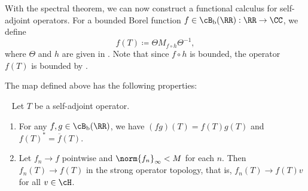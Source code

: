 \documentclass[oneside,reqno,letterpaper]{amsart}
\begin{document}
With the spectral theorem, we can now construct a functional calculus for self-adjoint operators. 
For a bounded Borel function \(f \in \cB_\mathrm{b}(\RR): \RR \to \CC\), we define 
\[
  f(T) \coloneqq \Theta M_{f \circ h} \Theta^{-1}, 
\] 
where \(\Theta\) and \(h\) are given in . 
Note that since \(f \circ h\) is bounded, the operator \(f(T)\) is bounded by . 

The map defined above has the following properties:
\begin{proposition}~
\label{thm:self-adjoint-FC}
  Let \(T\) be a self-adjoint operator. 
  \begin{enumerate}[label=(\alph*)]
    \item\label{enum:self-adjoint-FC:*homomorphism}
      For any \(f, g \in \cB_{\mathrm{b}}(\RR)\), we have \((fg)(T) = f(T)g(T)\) and \(f(T)^* = \overline{f}(T)\). 
    \item\label{enum:self-adjoint-FC:stronglim}
      Let \(f_{n} \to f\) pointwise and \(\norm{f_{n}}_{\infty} < M\) for each \(n\).
      Then \(f_{n}(T) \to f(T)\) in the strong operator topology, that is, \(f_{n}(T) \to f(T) v\) for all \(v \in \cH\).
  \end{enumerate}
\end{proposition}
\end{document}
